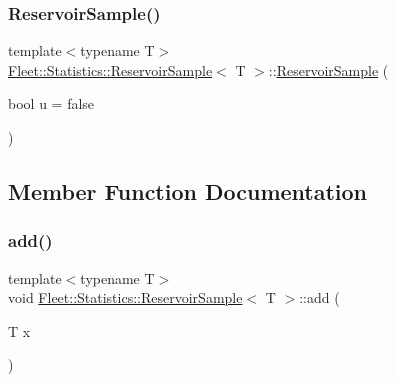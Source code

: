 \subsubsection{\texorpdfstring{Reservoir\+Sample()}{ReservoirSample()}\hspace{0.1cm}{\footnotesize\ttfamily [4/4]}}
{\footnotesize\ttfamily template$<$typename T$>$ \\
\hyperlink{class_fleet_1_1_statistics_1_1_reservoir_sample}{Fleet\+::\+Statistics\+::\+Reservoir\+Sample}$<$ T $>$\+::\hyperlink{class_fleet_1_1_statistics_1_1_reservoir_sample}{Reservoir\+Sample} (\begin{DoxyParamCaption}\item[{bool}]{u = {\ttfamily false} }\end{DoxyParamCaption})\hspace{0.3cm}{\ttfamily [inline]}}



\subsection{Member Function Documentation}
\mbox{\label{class_fleet_1_1_statistics_1_1_reservoir_sample_a96005aae9818ace5255f2af95a631c66}} 
\subsubsection{\texorpdfstring{add()}{add()}\hspace{0.1cm}{\footnotesize\ttfamily [1/2]}}
{\footnotesize\ttfamily template$<$typename T$>$ \\
void \hyperlink{class_fleet_1_1_statistics_1_1_reservoir_sample}{Fleet\+::\+Statistics\+::\+Reservoir\+Sample}$<$ T $>$\+::add (\begin{DoxyParamCaption}\item[{T}]{x }\end{DoxyParamCaption})\hspace{0.3cm}{\ttfamily [inline]}}

\mbox{\label{class_fleet_1_1_statistics_1_1_reservoir_sample_a374930296f502c957a925a5f7ba9087b}} 
